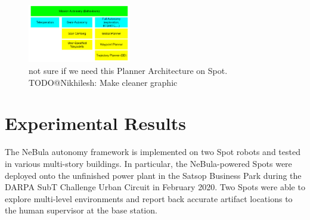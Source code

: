 \documentclass[a4paper, 10pt, conference]{ieeeconf}      %
\newcommand{\inst}[1]{{\color{orange} #1 }} %
\begin{document}



\begin{figure}[thpb]
  \centering
  \includegraphics[width=0.40\textwidth]{spot_iros/graphics/spot_planning.PNG}
  \caption{\inst{not sure if we need this} Planner Architecture on Spot. TODO@Nikhilesh: Make cleaner graphic}
  \label{figurelabel}
\end{figure}




\section{Experimental Results}\label{sec:experiments}

The NeBula autonomy framework is implemented on two Spot robots and tested in various multi-story buildings. In particular, the NeBula-powered Spots were deployed onto the unfinished power plant in the Satsop Business Park during the DARPA SubT Challenge Urban Circuit in February 2020. Two Spots were able to explore multi-level environments and report back accurate artifact locations to the human supervisor at the base station.
\end{document}
